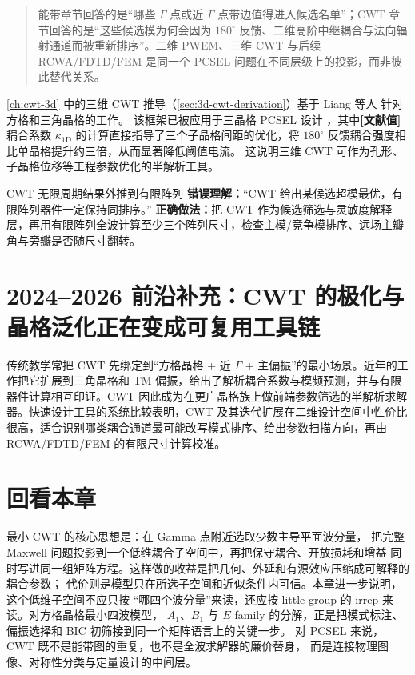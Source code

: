 \begin{quote}
能带章节回答的是“哪些 $\Gamma$ 点或近 $\Gamma$ 点带边值得进入候选名单”；CWT 章节回答的是“这些候选模为何会因为 $180^\circ$ 反馈、二维高阶中继耦合与法向辐射通道而被重新排序”。二维 PWEM、三维 CWT 与后续 RCWA/FDTD/FEM 是同一个 PCSEL 问题在不同层级上的投影，而非彼此替代关系。
\end{quote}

\begin{RigorousBox}
\cref{ch:cwt-3d} 中的三维 CWT 推导（\cref{sec:3d-cwt-derivation}）基于 Liang 等人
\cite{liang2012square,liang2013triangular} 针对方格和三角晶格的工作。
该框架已被应用于三晶格 PCSEL 设计 \cite{wang2024}，其中\textbf{[文献值]}耦合系数
$\kappa_{\mathrm{1D}}$ 的计算直接指导了三个子晶格间距的优化，将
$180^{\circ}$ 反馈耦合强度相比单晶格提升约三倍，从而显著降低阈值电流。
这说明三维 CWT 可作为孔形、子晶格位移等工程参数优化的半解析工具。
\end{RigorousBox}

\begin{CommonPitfallBox}{CWT 无限周期结果外推到有限阵列}
\textbf{错误理解：}“CWT 给出某候选超模最优，有限阵列器件一定保持同排序。”  
\textbf{正确做法：}把 CWT 作为候选筛选与灵敏度解释层，再用有限阵列全波计算至少三个阵列尺寸，检查主模/竞争模排序、远场主瓣角与旁瓣是否随尺寸翻转。
\end{CommonPitfallBox}

\section{2024--2026 前沿补充：CWT 的极化与晶格泛化正在变成可复用工具链}
传统教学常把 CWT 先绑定到“方格晶格 + 近 $\Gamma$ + 主偏振”的最小场景。近年的工作把它扩展到三角晶格和 {TM} 偏振，给出了解析耦合系数与模频预测，并与有限器件计算相互印证\cite{robinson2025tmcwt}。CWT 因此成为在更广晶格族上做前端参数筛选的半解析求解器。快速设计工具的系统比较表明，CWT 及其迭代扩展在二维设计空间中性价比很高，适合识别哪类耦合通道最可能改写模式排序、给出参数扫描方向，再由 RCWA/FDTD/FEM 的有限尺寸计算校准\cite{lang2025rapidpcseltools}。

\section*{回看本章}
最小 CWT 的核心思想是：在 Gamma 点附近选取少数主导平面波分量，
把完整 Maxwell 问题投影到一个低维耦合子空间中，再把保守耦合、开放损耗和增益
同时写进同一组矩阵方程。这样做的收益是把几何、外延和有源效应压缩成可解释的耦合参数；
代价则是模型只在所选子空间和近似条件内可信。本章进一步说明，这个低维子空间不应只按
“哪四个波分量”来读，还应按 little-group 的 irrep 来读。对方格晶格最小四波模型，
$A_1$、$B_1$ 与 $E$ family 的分解，正是把模式标注、偏振选择和 BIC 初筛接到同一个矩阵语言上的关键一步。
对 PCSEL 来说，CWT 既不是能带图的重复，也不是全波求解器的廉价替身，
而是连接物理图像、对称性分类与定量设计的中间层。

